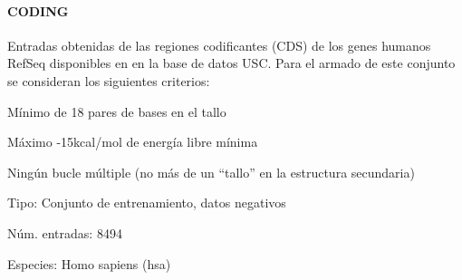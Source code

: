 \documentclass[12pt,bibliography=oldstyle,DIV=12,parskip=half-,titlepage]{scrartcl}
\begin{document}
\paragraph{CODING}
Entradas obtenidas de las regiones codificantes (CDS) de los genes
humanos RefSeq disponibles en en la base de datos USC.  Para
el armado de este conjunto se consideran los siguientes criterios:
\begin{itemize*}
\item Mínimo de 18 pares de bases en el tallo
\item Máximo -15kcal/mol de energía libre mínima
\item Ningún bucle múltiple (no más de un ``tallo'' en la estructura
  secundaria)
\end{itemize*}
\begin{description*}
\item[Tipo:] Conjunto de entrenamiento, datos negativos
\item[Núm. entradas:] 8494
\item[Especies:]  Homo sapiens (hsa)
\end{description*}
%
%
%
%
%
\end{document}
